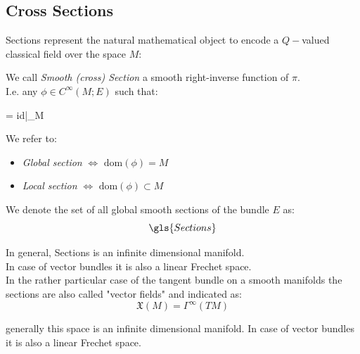 \documentclass[Main]{subfiles}
\begin{document}
		\subsection{Cross Sections}
			Sections represent the natural mathematical object to encode a $Q-$valued classical field over the space $M$:			
			\begin{definition}
				We call \emph{Smooth (cross) Section} a smooth right-inverse function of $\pi$.\\
				I.e. any $\phi\in C^\infty(M;E)$ such that:
				\begin{compactdisplaymath}
					\pi\circ\phi = id|_M
				\end{compactdisplaymath}
			\end{definition}
				We refer to:
					\begin{itemize}
						\item \emph{Global section} $\Leftrightarrow$ $\textrm{dom}(\phi) = M$
						\item \emph{Local section} $\Leftrightarrow$ $\textrm{dom}(\phi) \subset M$
					\end{itemize}
				We denote the set of all global smooth sections of the bundle $E$  as:
				\begin{displaymath}
					\gls{Sections}
				\end{displaymath}
\ifToninus
		\begin{observation}
			In general, \gls{Sections} is an infinite dimensional manifold. 
			\\
				In case of vector bundles it is also a linear Frechet space\cite{Kriegl}.
			\\
			In the rather particular case of the tangent bundle on a smooth manifolds the sections are also called "vector fields" and indicated as:
			\begin{displaymath}
				\mathfrak{X}(M) = \Gamma^\infty(TM)
			\end{displaymath}
		\end{observation}
\else
			generally this space is an infinite dimensional manifold.
			In case of vector bundles it is also a linear Frechet space\cite{Kriegl}.
\fi
\end{document}
